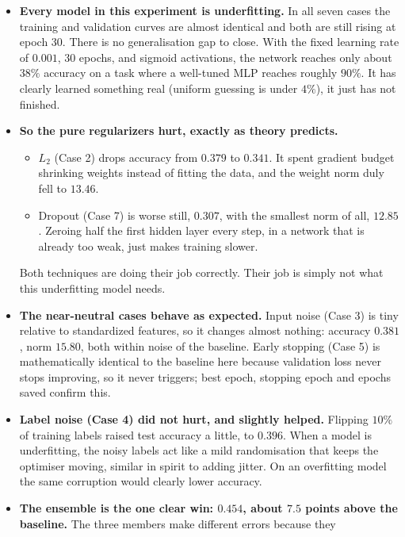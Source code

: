 \documentclass[12pt]{article}
\begin{document}
\begin{itemize}
\item \textbf{Every model in this experiment is underfitting.} In all seven
      cases the training and validation curves are almost identical and both are
      still rising at epoch 30. There is no generalisation gap to close. With
      the fixed learning rate of $0.001$, 30 epochs, and sigmoid activations,
      the network reaches only about $38\%$ accuracy on a task where a
      well-tuned MLP reaches roughly $90\%$. It has clearly learned something
      real (uniform guessing is under $4\%$), it just has not finished.
\item \textbf{So the pure regularizers hurt, exactly as theory predicts.}
      \begin{itemize}
      \item $L_2$ (Case 2) drops accuracy from $0.379$ to $0.341$. It spent
            gradient budget shrinking weights instead of fitting the data, and
            the weight norm duly fell to $13.46$.
      \item Dropout (Case 7) is worse still, $0.307$, with the smallest norm of
            all, $12.85$. Zeroing half the first hidden layer every step, in a
            network that is already too weak, just makes training slower.
      \end{itemize}
      Both techniques are doing their job correctly. Their job is simply not
      what this underfitting model needs.
\item \textbf{The near-neutral cases behave as expected.} Input noise (Case 3)
      is tiny relative to standardized features, so it changes almost nothing:
      accuracy $0.381$, norm $15.80$, both within noise of the baseline. Early
      stopping (Case 5) is mathematically identical to the baseline here because
      validation loss never stops improving, so it never triggers; best epoch,
      stopping epoch and epochs saved confirm this.
\item \textbf{Label noise (Case 4) did not hurt, and slightly helped.}
      Flipping $10\%$ of training labels raised test accuracy a little, to
      $0.396$. When a model is underfitting, the noisy labels act like a mild
      randomisation that keeps the optimiser moving, similar in spirit to
      adding jitter. On an overfitting model the same corruption would clearly
      lower accuracy.
\item \textbf{The ensemble is the one clear win: $0.454$, about $7.5$ points
      above the baseline.} The three members make different errors because they

\end{itemize}
\end{document}
